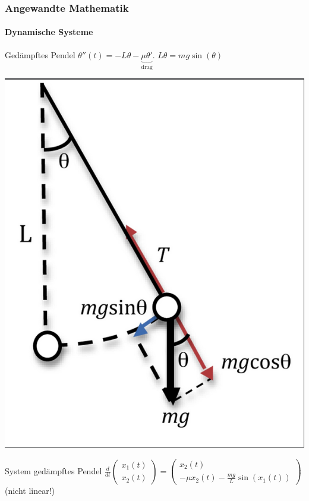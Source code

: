 \documentclass{beamer}
\begin{document}
\begin{frame}
    \frametitle{Angewandte Mathematik}
\framesubtitle{Dynamische Systeme }
\begin{block}{Gedämpftes Pendel}
$\theta''(t) = -L \theta - \underbrace{\mu \theta'}_{\text{drag}}$. $L \theta = mg \sin(\theta)$ 
\end{block}
\includegraphics[scale=0.2]{images/pendulum0}
\begin{block}{System gedämpftes Pendel}
    $ \frac{d}{dt}\begin{pmatrix}
        x_1(t) \\ x_2(t)
    \end{pmatrix} = 
    \begin{pmatrix}
        x_2(t) \\ -\mu x_2(t) - \frac{m g}{L} \sin(x_1(t))  
    \end{pmatrix} $ (nicht linear!)
    \end{block}
 \end{frame}
\end{document}
